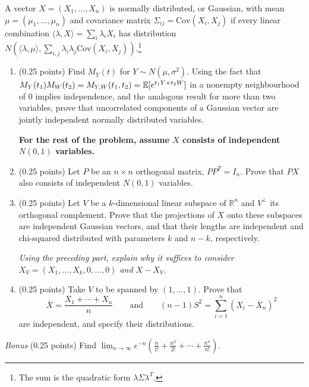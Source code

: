 \documentclass[a4paper]{report}
\begin{document}
\begin{problem}
A vector $X=(X_1,\ldots,X_n)$ is normally distributed, or Gaussian, with mean $\mu=(\mu_1,\ldots,\mu_n)$ and covariance matrix $\Sigma_{ij}=\mathrm{Cov}(X_i,X_j)$ if every linear combination $\langle\lambda,X\rangle=\sum_i\lambda_iX_i$ has distribution $N(\langle\lambda,\mu\rangle,\sum_{i,j}\lambda_i\lambda_j\mathrm{Cov}(X_i,X_j))$.\footnote{The sum is the quadratic form $\lambda\Sigma\lambda^T$.}
\begin{enumerate}
\item (0.25 points) Find $M_Y(t)$ for $Y\sim N(\mu,\sigma^2)$. Using the fact that $M_Y(t_1)M_W(t_2)=M_{Y,W}(t_1,t_2)=\mathbb {E}[e^{t_1Y+t_2W}]$ in a nonempty neighbourhood of 0 implies independence, and the analogous result for more than two variables, prove that uncorrelated components of a Gaussian vector are jointly independent normally distributed variables.

\textbf{For the rest of the problem, assume $X$ consists of independent $N(0,1)$ variables.}
\item (0.25 points) Let $P$ be an $n\times n$ orthogonal matrix, $PP^T=I_n$. Prove that $PX$ also consists of independent $N(0,1)$ variables.
\item (0.25 points) Let $V$ be a $k$-dimensional linear subspace of $\mathbb R^n$ and $V^\perp$ its orthogonal complement. Prove that the projections of $X$ onto these subspaces are independent Gaussian vectors, and that their lengths are independent and chi-squared distributed with parameters $k$ and $n-k$, respectively.

\emph{Using the preceding part, explain why it suffices to consider $X_V=(X_1,\ldots,X_k,0,\ldots,0)$ and $X-X_V$.}
\item (0.25 points) Take $V$ to be spanned by $(1,\ldots,1)$. Prove that
\[\overline X=\frac{X_1+\cdots+X_n}{n}\qquad\text{and}\qquad(n-1)S^2=\sum_{i=1}^n(X_i-\overline X_n)^2\]
are independent, and specify their distributions.
\end{enumerate}
\end{problem}
\begin{problem} \emph{Bonus} (0.25 points)
Find $\displaystyle\lim_{n\to\infty}e^{-n}\left(\frac n{1!}+\frac{n^2}{2!}+\cdots+\frac{n^n}{n!}\right)$.
\end{problem}
\end{document}
